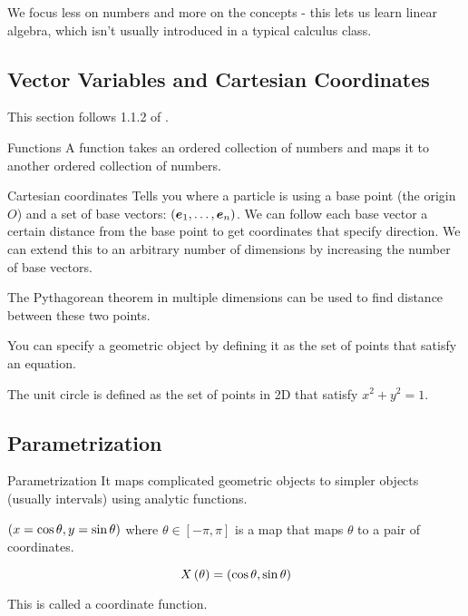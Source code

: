 \documentclass[11pt]{article}
\begin{document}
We focus less on numbers and more on the concepts - this lets us learn linear algebra, which isn't usually introduced in a typical calculus class.

\subsection{Vector Variables and  Cartesian Coordinates}

This section follows 1.1.2 of \cite{carlen}.

\begin{definition}{Functions}
  A function takes an ordered collection of numbers and maps it to another ordered collection of numbers.
\end{definition}

\begin{definition}{Cartesian coordinates}
  Tells you where a particle is using a base point (the origin $O$) and a set of base vectors: $\left ( \bm{e}_1, \dots, \bm{e}_n \right)$.
  We can follow each base vector a certain distance from the base point to get coordinates that specify direction.
  We can extend this to an arbitrary number of dimensions by increasing the number of base vectors.
\end{definition}

The Pythagorean theorem in multiple dimensions can be used to find distance between these two points.

You can specify a geometric object by defining it as the set of points that satisfy an equation.

\begin{example}{}
  The unit circle is defined as the set of points in 2D that satisfy $x^2 + y^2 = 1$.
\end{example}


\subsection{Parametrization}

\begin{definition}{Parametrization}
  It maps complicated geometric objects to simpler objects (usually intervals) using analytic functions.
\end{definition}

\begin{example}
  
  $\left ( x = \cos{\theta}, y = \sin{\theta} \right)$ where $\theta \in [-\pi, \pi]$ is a map that maps $\theta$ to a pair of coordinates.
  
  $$
  X\left ( \theta \right) = \left ( \cos \theta, \sin \theta \right)
  $$

  This is called a coordinate function.
\end{example}
\end{document}
